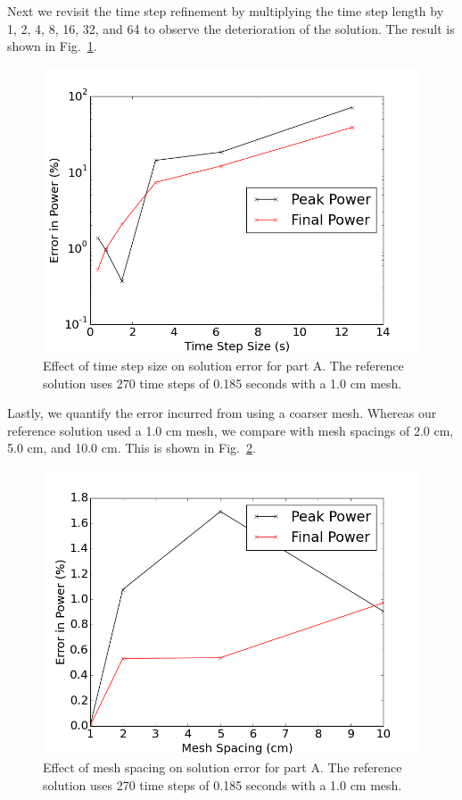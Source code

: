 \documentclass[12pt]{report}
\begin{document}
	Next we revisit the time step refinement by multiplying the time step length by 1, 2, 4, 8, 16, 32, and 64 to observe the deterioration of the solution. The result is shown in Fig.~\ref{fig::partA_timestep}.
	\begin{figure}[ht]
		\centering
		\includegraphics[width=.7\linewidth]{figs/partA_timeStep.png}
		\caption{Effect of time step size on solution error for part A. The reference solution uses 270 time steps of 0.185 seconds with a 1.0 cm mesh.}
		\label{fig::partA_timestep}
	\end{figure}
	
		Lastly, we quantify the error incurred from using a coarser mesh. Whereas our reference solution used a 1.0 cm mesh, we compare with mesh spacings of 2.0 cm, 5.0 cm, and 10.0 cm. This is shown in Fig.~\ref{fig::partA_spatial}.
			\begin{figure}[ht]
				\centering
				\includegraphics[width=.7\linewidth]{figs/partA_spatial.png}
				\caption{Effect of mesh spacing on solution error for part A. The reference solution uses 270 time steps of 0.185 seconds with a 1.0 cm mesh.}
				\label{fig::partA_spatial}
			\end{figure}
	
\end{document}
